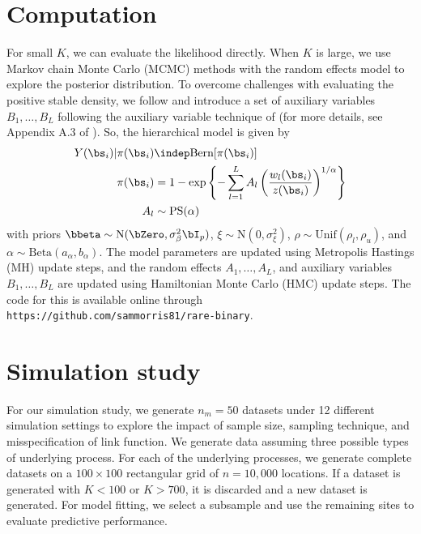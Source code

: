 \section{Computation}\label{rbs:comp}
For small $K$, we can evaluate the likelihood directly.
When $K$ is large, we use Markov chain Monte Carlo (MCMC) methods with the random effects model to explore the posterior distribution.
To overcome challenges with evaluating the positive stable density, we follow \citet{Reich2012} and introduce a set of auxiliary variables $B_1, \ldots, B_L$ following the auxiliary variable technique of \citet{Stephenson2009} (for more details, see Appendix A.3 of \citet{Reich2012}).
So, the hierarchical model is given by
\begin{align}
  Y(\bs_i) | \pi(\bs_i) &\indep \text{Bern}[\pi(\bs_i)] \\
    \pi(\bs_i) &= 1 - \exp \left\{ -\displaystyle \sum_{ l = 1 }^{L} A_l \left( \frac{ w_{l}(\bs_i) }{ z(\bs_i) } \right)^{ 1/\alpha} \right\} \nonumber\\
    A_l &\sim \text{PS}(\alpha) \nonumber
\end{align}
with priors $\bbeta \sim \text{N}(\bZero, \sigma^2_\beta \bI_p )$, $\xi \sim \text{N}(0, \sigma^2_\xi)$, $\rho \sim \text{Unif}(\rho_l, \rho_u)$, and $\alpha \sim \text{Beta}(a_\alpha, b_\alpha)$.
The model parameters are updated using Metropolis Hastings (MH) update steps, and the random effects $A_1, \ldots, A_L$, and auxiliary variables $B_1, \ldots, B_L$ are updated using Hamiltonian Monte Carlo (HMC) update steps.
The code for this is available online through \texttt{https://github.com/sammorris81/rare-binary}.

\section{Simulation study}\label{rbs:sim}

For our simulation study, we generate $n_m = 50$ datasets under 12 different simulation settings to explore the impact of sample size, sampling technique, and misspecification of link function.
We generate data assuming three possible types of underlying process.
For each of the underlying processes, we generate complete datasets on a $100 \times 100$ rectangular grid of $n = 10,000$ locations.
If a dataset is generated with $K < 100$ or $K > 700$, it is discarded and a new dataset is generated.
For model fitting, we select a subsample and use the remaining sites to evaluate predictive performance.

